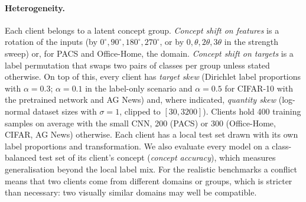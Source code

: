 \paragraph{Heterogeneity.} Each client belongs to a latent concept group. \emph{Concept shift on features} is a rotation of the inputs (by $0^\circ,90^\circ,180^\circ,270^\circ$, or by $0,\theta,2\theta,3\theta$ in the strength sweep) or, for PACS and Office-Home, the domain. \emph{Concept shift on targets} is a label permutation that swaps two pairs of classes per group unless stated otherwise. On top of this, every client has \emph{target skew} (Dirichlet label proportions with $\alpha=0.3$; $\alpha=0.1$ in the label-only scenario and $\alpha=0.5$ for CIFAR-10 with the pretrained network and AG News) and, where indicated, \emph{quantity skew} (log-normal dataset sizes with $\sigma=1$, clipped to $[30,3200]$). Clients hold 400 training samples on average with the small CNN, 200 (PACS) or 300 (Office-Home, CIFAR, AG News) otherwise. Each client has a local test set drawn with its own label proportions and transformation. We also evaluate every model on a class-balanced test set of its client's concept (\emph{concept accuracy}), which measures generalisation beyond the local label mix. For the realistic benchmarks a conflict means that two clients come from different domains or groups, which is stricter than necessary: two visually similar domains may well be compatible.

